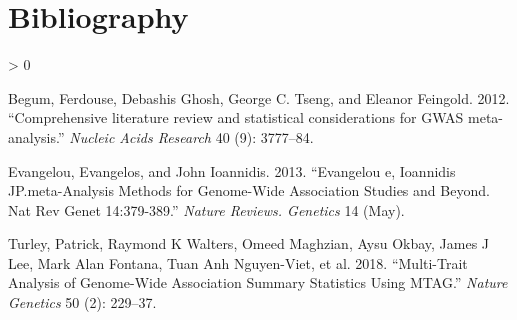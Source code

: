 \documentclass[
]{article}
\newlength{\cslhangindent}
\newenvironment{CSLReferences}[2] %
 {%
  \setlength{\parindent}{0pt}
  \ifodd #1 \everypar{\setlength{\hangindent}{\cslhangindent}}\ignorespaces\fi
  \ifnum #2 > 0
  \setlength{\parskip}{#2\baselineskip}
  \fi
 }%
 {}
\begin{document}
\clearpage

\hypertarget{bibliography}{%
\section{Bibliography}\label{bibliography}}

\setlength{\parindent}{-0.2in}
\setlength{\leftskip}{0.2in}
\setlength{\parskip}{8pt}

\noindent

\hypertarget{refs}{}
\begin{CSLReferences}{1}{0}
\leavevmode\hypertarget{ref-meta1}{}%
Begum, Ferdouse, Debashis Ghosh, George C. Tseng, and Eleanor Feingold.
2012. {``{Comprehensive literature review and statistical considerations
for GWAS meta-analysis}.''} \emph{Nucleic Acids Research} 40 (9):
3777--84.

\leavevmode\hypertarget{ref-meta2}{}%
Evangelou, Evangelos, and John Ioannidis. 2013. {``Evangelou e,
Ioannidis JP.meta-Analysis Methods for Genome-Wide Association Studies
and Beyond. Nat Rev Genet 14:379-389.''} \emph{Nature Reviews. Genetics}
14 (May).

\leavevmode\hypertarget{ref-MTAG}{}%
Turley, Patrick, Raymond K Walters, Omeed Maghzian, Aysu Okbay, James J
Lee, Mark Alan Fontana, Tuan Anh Nguyen-Viet, et al. 2018.
{``Multi-Trait Analysis of Genome-Wide Association Summary Statistics
Using MTAG.''} \emph{Nature Genetics} 50 (2): 229--37.

\end{CSLReferences}
\end{document}
